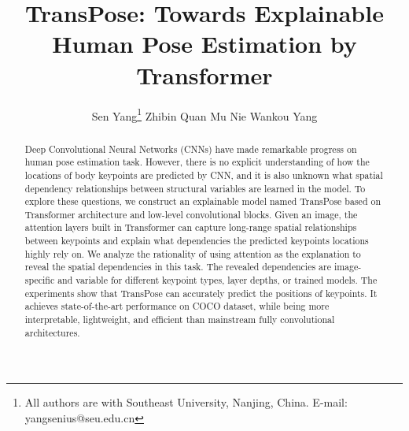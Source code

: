\documentclass{article}
\begin{document}
\title{TransPose: Towards Explainable Human Pose Estimation by Transformer}
\author{Sen Yang\thanks{All authors are with Southeast University, Nanjing, China. E-mail: yangsenius@seu.edu.cn} \quad Zhibin Quan \quad Mu Nie \quad Wankou Yang
}
\date{}
\maketitle\vspace*{-0.2in}

\begin{abstract}
	Deep Convolutional Neural Networks (CNNs) have made remarkable progress on human pose estimation task. However, there is no explicit understanding of how the locations of body keypoints are predicted by CNN, and it is also unknown what spatial dependency relationships between structural variables are learned in the model. To explore these questions, we construct an explainable model named TransPose based on Transformer architecture and low-level convolutional blocks. Given an image, the attention layers built in Transformer can capture long-range spatial relationships between keypoints and explain what dependencies the predicted keypoints locations highly rely on. We analyze the rationality of using attention as the explanation to reveal the spatial dependencies in this task. The revealed dependencies are image-specific and variable for different keypoint types, layer depths, or trained models. The experiments show that TransPose can accurately predict the positions of keypoints. It achieves state-of-the-art performance on COCO dataset, while being more interpretable, lightweight, and efficient than mainstream fully convolutional architectures. 
\end{abstract}\vspace*{-0.2in}
\end{document}
